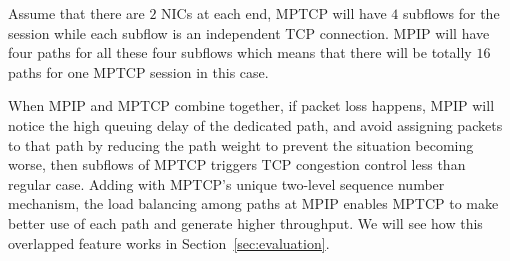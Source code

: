 Assume that there are $2$ NICs at each end, MPTCP will have $4$ subflows for the session while each subflow is an independent TCP connection. MPIP will have four paths for all these four subflows which means that there will be totally $16$ paths for one MPTCP session in this case. 

When MPIP and MPTCP combine together, if packet loss happens, MPIP will notice the high queuing delay of the dedicated path, and avoid assigning packets to that path by reducing the path weight to prevent the situation becoming worse, then subflows of MPTCP triggers TCP congestion control less than regular case. Adding with MPTCP's unique two-level sequence number mechanism, the load balancing among paths at MPIP enables MPTCP to make better use of each path and generate higher throughput. We will see how this overlapped feature works in Section~\ref{sec:evaluation}.